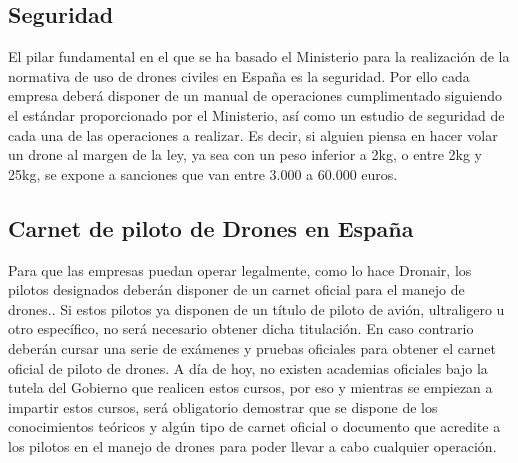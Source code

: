 \subsection{Seguridad}
El pilar fundamental en el que se ha basado el Ministerio para la realización de la normativa de uso de drones civiles en España es la seguridad. Por ello cada empresa deberá disponer de un manual de operaciones cumplimentado siguiendo el estándar proporcionado por el Ministerio, así como un estudio de seguridad de cada una de las operaciones a realizar. Es decir, si alguien piensa en hacer volar un drone al margen de la ley, ya sea con un peso inferior a 2kg, o entre 2kg y 25kg, se expone a sanciones que van entre 3.000 a 60.000 euros.

\subsection{Carnet de piloto de Drones en España}
Para que las empresas puedan operar legalmente, como lo hace Dronair, los pilotos designados deberán disponer de un carnet oficial para el manejo de drones.. Si estos pilotos ya disponen de un título de piloto de avión, ultraligero u otro específico, no será necesario obtener dicha titulación. En caso contrario deberán cursar una serie de exámenes y pruebas oficiales para obtener el carnet oficial de piloto de drones. A día de hoy, no existen academias oficiales bajo la tutela del Gobierno que realicen estos cursos, por eso y mientras se empiezan a impartir estos cursos, será obligatorio demostrar que se dispone de los conocimientos teóricos y algún tipo de carnet oficial o documento que acredite a los pilotos en el manejo de drones para poder llevar a cabo cualquier operación.